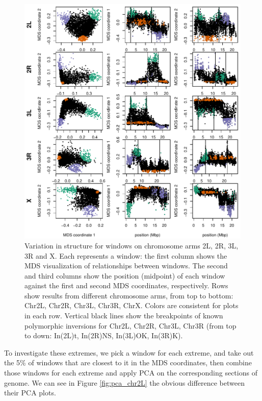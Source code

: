 \documentclass[11pt, oneside]{article}   	%
\begin{document}
\begin{figure}
    \begin{center}
       \includegraphics{Fig1_allchr_Together_MDS_plot_compact}
    \end{center}
    \caption{
         Variation in structure for windows on chromosome arms 2L, 2R, 3L, 3R and X. 
         Each represents a window: the first column shows the MDS visualization of relationships between windows. 
         The second and third columns show the position (midpoint) of each window against the first and second MDS coordinates, respectively. 
         Rows show results from different chromosome arms, from top to bottom: Chr2L, Chr2R, Chr3L, Chr3R, ChrX. 
         Colors are consistent for plots in each row. 
         Vertical black lines show the breakpoints of known polymorphic inversions for Chr2L, Chr2R, Chr3L, Chr3R (from top to down: In(2L)t, In(2R)NS, In(3L)OK, In(3R)K).
         \label{fig:mds_chr2L}
    }
\end{figure}


To investigate these extremes, we pick a window for each extreme, 
and take out the 5\% of windows that are closest to it in the MDS coordinates, 
then combine those windows for each extreme and apply PCA on the corresponding sections of genome. 
We can see in Figure \ref{fig:pca_chr2L} the obvious difference between their PCA plots. 
\end{document}
